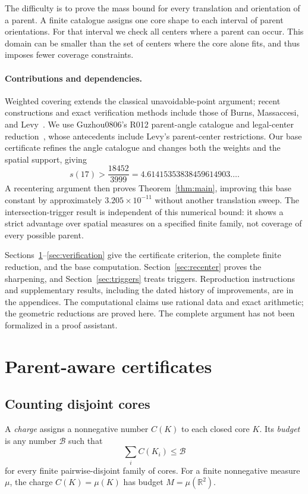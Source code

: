 \documentclass[11pt]{article}
\newcommand{\R}{\mathbb R}
\begin{document}
The difficulty is to prove the mass bound for every translation and
orientation of a parent. A finite catalogue assigns one core shape to each
interval of parent orientations. For that interval we check all centers where
a parent can occur. This domain can be smaller than the set of centers where
the core alone fits, and thus imposes fewer coverage constraints.

\paragraph{Contributions and dependencies.}
Weighted covering extends the classical unavoidable-point argument; recent
constructions and exact verification methods include those of Burns,
Massaccesi, and Levy~\cite{Burns,Massaccesi,Levy}. We use Guzhou0806's R012
parent-angle catalogue and legal-center reduction~\cite{Guzhou}, whose
antecedents include Levy's parent-center restrictions. Our base certificate
refines the angle catalogue and changes both the weights and the spatial
support, giving
\[
  s(17)>\frac{18452}{3999}=4.61415353838459614903\ldots.
\]
A recentering argument then proves Theorem~\ref{thm:main}, improving this base
constant by approximately $3.205\times10^{-11}$ without another translation
sweep. The intersection-trigger result is independent of this numerical bound:
it shows a strict advantage over spatial measures on a specified finite family,
not coverage of every possible parent.

Sections~\ref{sec:certificate}--\ref{sec:verification} give the certificate
criterion, the complete finite reduction, and the base computation.
Section~\ref{sec:recenter} proves the sharpening, and Section~\ref{sec:triggers}
treats triggers. Reproduction instructions and supplementary results, including
the dated history of improvements, are in the appendices. The computational
claims use rational data and exact arithmetic; the geometric reductions are
proved here. The complete argument has not been formalized in a proof assistant.

\section{Parent-aware certificates}\label{sec:certificate}

\subsection{Counting disjoint cores}

A \emph{charge} assigns a nonnegative number $C(K)$ to each closed core $K$.
Its \emph{budget} is any number $\mathcal B$ such that
\[
  \sum_i C(K_i)\le\mathcal B
\]
for every finite pairwise-disjoint family of cores. For a finite nonnegative
measure $\mu$, the charge $C(K)=\mu(K)$ has budget $M=\mu(\R^2)$.
\end{document}
